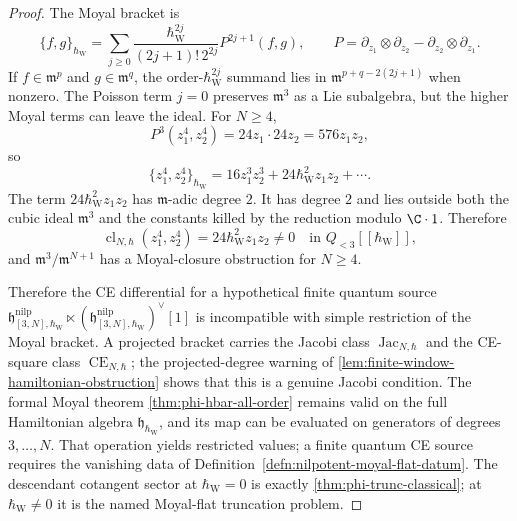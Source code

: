 \begin{proof}
  The Moyal bracket is
  $$\{f,g\}_{\hbar_{\mathrm{W}}}=\sum_{j\geq 0}
    \frac{\hbar_{\mathrm{W}}^{2j}}{(2j+1)!\,2^{2j}}P^{2j+1}(f,g),\qquad
    P=\partial_{z_1}\otimes\partial_{z_2}
      -\partial_{z_2}\otimes\partial_{z_1}.$$
  If $f\in\mathfrak m^p$ and $g\in\mathfrak m^q$, the
  order-\(\hbar_{\mathrm{W}}^{2j}\) summand lies in
  $\mathfrak m^{p+q-2(2j+1)}$ when nonzero.  The Poisson term
  $j=0$ preserves $\mathfrak m^3$ as a Lie subalgebra, but the
  higher Moyal terms can leave the ideal.  For $N\geq4$,
  $$P^3(z_1^4,z_2^4)=24z_1\cdot24z_2=576z_1z_2,$$
  so
  $$\{z_1^4,z_2^4\}_{\hbar_{\mathrm{W}}}
    =16z_1^3z_2^3+24\hbar_{\mathrm{W}}^2 z_1z_2+\cdots.$$
  The term \(24\hbar_{\mathrm{W}}^2z_1z_2\) has \(\mathfrak m\)-adic degree \(2\).
  It has degree \(2\) and lies outside both the cubic ideal
  \(\mathfrak m^3\) and the constants killed by the reduction modulo
  \(\C\cdot1\).  Therefore
  \[
    \operatorname{cl}_{N,\hbar}(z_1^4,z_2^4)
    =
    24\hbar_{\mathrm{W}}^2z_1z_2
    \neq0
    \quad\text{in }Q_{<3}[[\hbar_{\mathrm{W}}]],
  \]
  and \(\mathfrak m^3/\mathfrak m^{N+1}\) has a Moyal-closure
  obstruction for \(N\geq4\).

  Therefore the CE differential for a hypothetical finite quantum
  source
  $\mathfrak h^{\mathrm{nilp}}_{[3,N],\hbar_{\mathrm{W}}}\ltimes
  (\mathfrak h^{\mathrm{nilp}}_{[3,N],\hbar_{\mathrm{W}}})^\vee[1]$ is incompatible with simple
  restriction of the Moyal bracket.  A projected bracket carries the
  Jacobi class \(\operatorname{Jac}_{N,\hbar}\) and the CE-square class
  \(\operatorname{CE}_{N,\hbar}\); the projected-degree warning of
  \ref{lem:finite-window-hamiltonian-obstruction} shows that this is
  a genuine Jacobi condition.  The formal Moyal theorem
  \ref{thm:phi-hbar-all-order} remains valid on the full
  Hamiltonian algebra $\mathfrak h_{\hbar_{\mathrm{W}}}$, and its map can be
  evaluated on generators of degrees $3,\ldots,N$.  That operation yields
  restricted values; a finite quantum CE source requires the vanishing
  data of Definition~\ref{defn:nilpotent-moyal-flat-datum}.  The descendant
  cotangent sector at \(\hbar_{\mathrm{W}}=0\) is exactly
  \ref{thm:phi-trunc-classical}; at \(\hbar_{\mathrm{W}}\neq0\) it is the named
  Moyal-flat truncation problem.
\end{proof}

